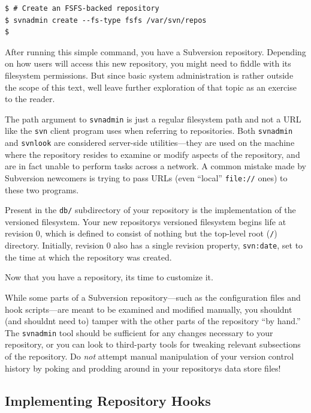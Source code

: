 \begin{verbatim}
$ # Create an FSFS-backed repository
$ svnadmin create --fs-type fsfs /var/svn/repos
$
\end{verbatim}

After running this simple command, you have a Subversion repository.
Depending on how users will access this new repository, you might need
to fiddle with its filesystem permissions. But since basic system
administration is rather outside the scope of this text,
we\textquotesingle ll leave further exploration of that topic as an
exercise to the reader.

The path argument to \texttt{svnadmin} is just a regular filesystem path
and not a URL like the \texttt{svn} client program uses when referring
to repositories. Both \texttt{svnadmin} and \texttt{svnlook} are
considered server-side utilities---they are used on the machine where
the repository resides to examine or modify aspects of the repository,
and are in fact unable to perform tasks across a network. A common
mistake made by Subversion newcomers is trying to pass URLs (even
``local'' \texttt{file://} ones) to these two programs.

Present in the \texttt{db/} subdirectory of your repository is the
implementation of the versioned filesystem. Your new
repository\textquotesingle s versioned filesystem begins life at
revision 0, which is defined to consist of nothing but the top-level
root (\texttt{/}) directory. Initially, revision 0 also has a single
revision property, \texttt{svn:date}, set to the time at which the
repository was created.

Now that you have a repository, it\textquotesingle s time to customize
it.

While some parts of a Subversion repository---such as the configuration
files and hook scripts---are meant to be examined and modified manually,
you shouldn\textquotesingle t (and shouldn\textquotesingle t need to)
tamper with the other parts of the repository ``by hand.'' The
\texttt{svnadmin} tool should be sufficient for any changes necessary to
your repository, or you can look to third-party tools for tweaking
relevant subsections of the repository. Do \emph{not} attempt manual
manipulation of your version control history by poking and prodding
around in your repository\textquotesingle s data store files!

\subsection{Implementing Repository Hooks}\label{svn.reposadmin.hooks}

